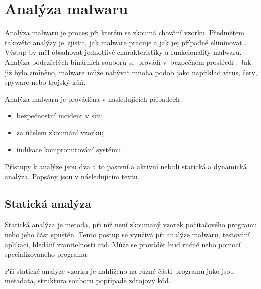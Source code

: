 \section{Analýza malwaru}

Analýza malwaru je proces při kterém se zkoumá chování vzorku. Předmětem takovéto analýzy je~zjistit, jak malware pracuje a jak jej případně eliminovat \cite{malwareanalysis_digitalguardian}. Výstup by měl obsahovat jednotlivé charakteristiky a funkcionality malwaru. Analýza podezřelých binárních souborů se~provádí v~bezpečném prostředí \cite{monnappaka2018}. Jak již bylo zmíněno, malware může nabývat mnoha podob jako například virus, červ, spyware nebo trojský kůň.

Analýza malwaru je prováděna v následujících případech \cite{malwareanalysis_digitalguardian}:

\begin{itemize}
    \item bezpečnostní incident v síti;
    \item za účelem zkoumání vzorku;
    \item indikace kompromitování systému.
\end{itemize}

Přístupy k analýze jsou dva a to pasivní a aktivní neboli statická a dynamická analýza. Popsány jsou v následujícím textu.

\subsection{Statická analýza}

Statická analýza je metoda, při níž není zkoumaný vzorek počítačového programu nebo jeho část spuštěn. Tento postup se využívá při analýze malwaru, testování aplikací, hledání zranitelnosti atd. Může se provádět buď ručně nebo pomocí specializovaného programu.

    Při statické analýze vzorku je nahlíženo na různé části programu jako jsou metadata, struktura souboru popřípadě zdrojový kód. 

    


